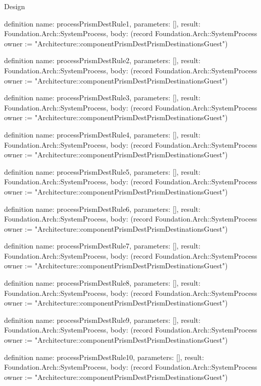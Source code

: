 \begin{lexlean}{Design}
\begin{semanticmodule}
definition{
  name: processPrismDestRule1,
  parameters: [],
  result: Foundation.Arch::SystemProcess,
  body: (record Foundation.Arch::SystemProcess {owner := "Architecture::componentPrismDestPrismDestinationsGuest"})
}

definition{
  name: processPrismDestRule2,
  parameters: [],
  result: Foundation.Arch::SystemProcess,
  body: (record Foundation.Arch::SystemProcess {owner := "Architecture::componentPrismDestPrismDestinationsGuest"})
}

definition{
  name: processPrismDestRule3,
  parameters: [],
  result: Foundation.Arch::SystemProcess,
  body: (record Foundation.Arch::SystemProcess {owner := "Architecture::componentPrismDestPrismDestinationsGuest"})
}

definition{
  name: processPrismDestRule4,
  parameters: [],
  result: Foundation.Arch::SystemProcess,
  body: (record Foundation.Arch::SystemProcess {owner := "Architecture::componentPrismDestPrismDestinationsGuest"})
}

definition{
  name: processPrismDestRule5,
  parameters: [],
  result: Foundation.Arch::SystemProcess,
  body: (record Foundation.Arch::SystemProcess {owner := "Architecture::componentPrismDestPrismDestinationsGuest"})
}

definition{
  name: processPrismDestRule6,
  parameters: [],
  result: Foundation.Arch::SystemProcess,
  body: (record Foundation.Arch::SystemProcess {owner := "Architecture::componentPrismDestPrismDestinationsGuest"})
}

definition{
  name: processPrismDestRule7,
  parameters: [],
  result: Foundation.Arch::SystemProcess,
  body: (record Foundation.Arch::SystemProcess {owner := "Architecture::componentPrismDestPrismDestinationsGuest"})
}

definition{
  name: processPrismDestRule8,
  parameters: [],
  result: Foundation.Arch::SystemProcess,
  body: (record Foundation.Arch::SystemProcess {owner := "Architecture::componentPrismDestPrismDestinationsGuest"})
}

definition{
  name: processPrismDestRule9,
  parameters: [],
  result: Foundation.Arch::SystemProcess,
  body: (record Foundation.Arch::SystemProcess {owner := "Architecture::componentPrismDestPrismDestinationsGuest"})
}

definition{
  name: processPrismDestRule10,
  parameters: [],
  result: Foundation.Arch::SystemProcess,
  body: (record Foundation.Arch::SystemProcess {owner := "Architecture::componentPrismDestPrismDestinationsGuest"})
}


\end{semanticmodule}
\end{lexlean}
